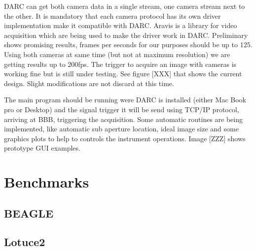 \documentclass[]{spie}  %
\begin{document}
DARC can get both camera data in a single stream, one camera stream next to the
other. It is mandatory that each camera protocol has its own driver
implementation make it compatible with DARC. Aravis is a library for video
acquisition which are being used to make the driver work in DARC. Preliminary
shows promising results, frames per seconds for our purposes should be up to
125. Using both cameras at same time (but not at maximum resolution) we are
getting results up to 200fps.  The trigger to acquire an image with cameras is
working fine but is still under testing. See figure [XXX] that shows the
current design. Slight modifications are not discard at this time.  

The main program should be running were DARC is installed (either Mac Book pro
or Desktop) and the signal trigger it will be send using TCP/IP protocol,
arriving at BBB, triggering the acquisition. Some automatic routines are being
implemented, like automatic sub aperture location, ideal image size and some
graphics plots to help to controls the instrument operations. Image [ZZZ] shows
prototype GUI examples.



\section{Benchmarks} \label{sec:benchmarks}
\subsection{BEAGLE}
\subsection{Lotuce2}

\end{document}
